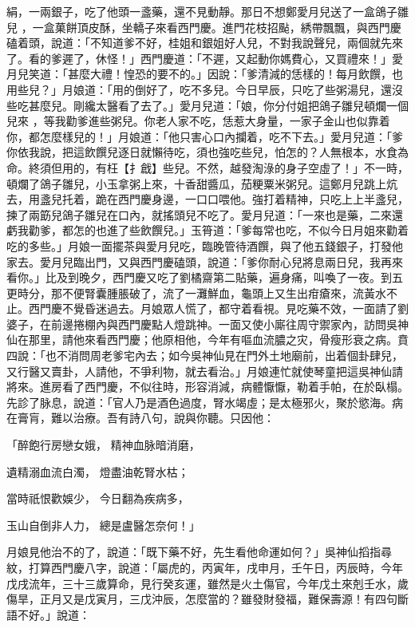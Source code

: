 絹，一兩銀子，吃了他頭一盞藥，還不見動靜。那日不想鄭愛月兒送了一盒鴿子雛兒 ，一盒菓餅頂皮酥，坐轎子來看西門慶。進門花枝招颭，綉帶飄飄，與西門慶磕着頭，說道：「不知道爹不好，桂姐和銀姐好人兒，不對我說聲兒，兩個就先來了。看的爹遲了，休怪！」西門慶道：「不遲，又起動你媽費心，又買禮來！」愛月兒笑道：「甚麼大禮！惶恐的要不的。」因說：「爹清減的恁樣的！每月飲饌，也用些兒？」月娘道：「用的倒好了，吃不多兒。今日早辰，只吃了些粥湯兒，還沒些吃甚麼兒。剛纔太醫看了去了。」愛月兒道：「娘，你分付姐把鴿子雛兒頓爛一個兒來 ，等我勸爹進些粥兒。你老人家不吃，恁惹大身量，一家子金山也似靠着你，都怎麼樣兒的！」月娘道：「他只害心口內攔着，吃不下去。」愛月兒道：「爹你依我說，把這飲饌兒逐日就懶待吃，須也強吃些兒，怕怎的？人無根本，水食為命。終須但用的，有枉【扌戧】些兒。不然，越發淘淥的身子空虛了！」不一時，頓爛了鴿子雛兒，小玉拿粥上來，十香甜醬瓜，茄粳粟米粥兒。這鄭月兒跳上炕去，用盞兒托着，跪在西門慶身邊，一口口喂他。強打着精神，只吃上上半盞兒，揀了兩筯兒鴿子雛兒在口內，就搖頭兒不吃了。愛月兒道：「一來也是藥，二來還虧我勸爹，都怎的也進了些飲饌兒。」玉筲道：「爹每常也吃，不似今日月姐來勸着吃的多些。」月娘一面擺茶與愛月兒吃，臨晚管待酒饌，與了他五錢銀子，打發他家去。愛月兒臨出門，又與西門慶磕頭，說道：「爹你耐心兒將息兩日兒，我再來看你。」比及到晚夕，西門慶又吃了劉橘齋第二貼藥，遍身痛，叫喚了一夜。到五更時分，那不便腎囊腫脹破了，流了一灘鮮血，龜頭上又生出疳瘡來，流黃水不止。西門慶不覺昏迷過去。月娘眾人慌了，都守着看視。見吃藥不效，一面請了劉婆子，在前邊捲棚內與西門慶點人燈跳神。一面又使小廝往周守禦家內，訪問吳神仙在那里，請他來看西門慶；他原相他，今年有嘔血流膿之灾，骨瘦形衰之病。賁四說：「也不消問周老爹宅內去；如今吳神仙見在門外土地廟前，出着個卦肆兒，又行醫又賣卦，人請他，不爭利物，就去看治。」月娘連忙就使琴童把這吳神仙請將來。進房看了西門慶，不似往時，形容消減，病體懨懨，勒着手帕，在於臥榻。先診了脉息，說道：「官人乃是酒色過度，腎水竭虛；是太極邪火，聚於慾海。病在膏肓，難以治療。吾有詩八句，說與你聽。只因他：

「醉飽行房戀女娥，  精神血脉暗消磨，

遺精溺血流白濁，  燈盡油乾腎水枯；

當時祇恨歡娛少，  今日翻為疾病多，

玉山自倒非人力，  總是盧醫怎奈何！」

月娘見他治不的了，說道：「既下藥不好，先生看他命運如何？」吳神仙搯指尋紋，打算西門慶八字，說道：「屬虎的，丙寅年，戌申月，壬午日，丙辰時，今年戊戌流年，三十三歲算命，見行癸亥運，雖然是火土傷官，今年戊土來剋壬水，歲傷旱，正月又是戊寅月，三戊沖辰，怎麼當的？雖發財發福，難保壽源！有四句斷語不好。」說道：

